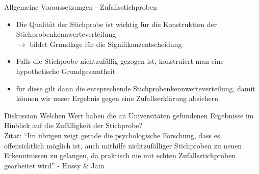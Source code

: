 \documentclass{beamer}
\begin{document}
	\begin{frame}{Allgemeine Voraussetzungen - Zufallsstichproben}
		\begin{itemize}
			\item Die Qualität der Stichprobe ist wichtig für die Konstruktion der Stichprobenkennwerteverteilung  \\
			$\rightarrow$ bildet Grundlage für die Signifikanzentscheidung
			\item Falls die Stichprobe nichtzufällig gezogen ist, konstruiert man eine hypothetische Grundgesamtheit 
			\item für diese gilt dann die entsprechende Stichprobenkennwerteverteilung, damit können wir unser Ergebnis gegen eine Zufallserklärung absichern
		\end{itemize}
	\end{frame}
	
	\begin{frame}{Diskussion}
		Welchen Wert haben die an Universitäten gefundenen Ergebnisse im Hinblick auf die Zufälligkeit der Stichprobe?\\
		
		 Zitat: ``Im übrigen zeigt gerade die psychologische Forschung, dass es offensichtlich möglich ist, auch mithilfe nichtzufälliger Stichproben zu neuen Erkenntnissen zu gelangen, da praktisch nie mit echten Zufallsstichproben gearbeitet wird'' - Hussy \& Jain
	\end{frame}
	
\end{document}
